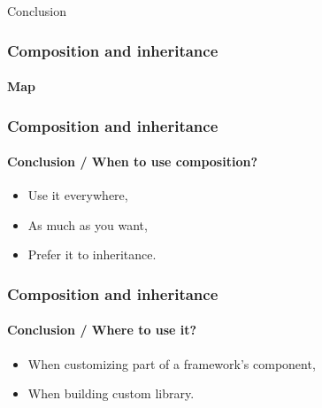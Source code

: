 \begin{sepframe}{Conclusion}{}
\end{sepframe}

\begin{frame}[fragile,c]
    \frametitle{Composition and inheritance}
    \framesubtitle{Map}

\end{frame}

\begin{frame}
    \frametitle{Composition and inheritance}
    \framesubtitle{Conclusion / When to use composition?}

    \begin{itemize}[<+->]
        \item Use it everywhere,
        \item As much as you want,
        \item Prefer it to inheritance.
    \end{itemize}
\end{frame}

\begin{frame}
    \frametitle{Composition and inheritance}
    \framesubtitle{Conclusion / Where to use it?}

    \begin{itemize}[<+->]
        \item When customizing part of a framework's component,
        \item When building custom library.
    \end{itemize}
\end{frame}

